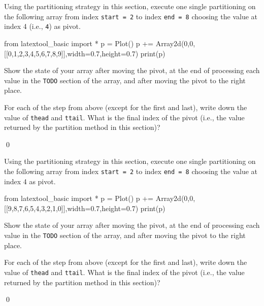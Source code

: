 \newpage
\begin{ex}
\begin{tightlist}
\item Using the partitioning strategy in this section,
execute one single partitioning on the following array
from index \verb!start = 2! to index \verb!end = 8!
choosing the value at index 4 (i.e., \verb!4!) as pivot.

\begin{python}
from latextool_basic import *
p = Plot()
p += Array2d(0,0,[[0,1,2,3,4,5,6,7,8,9]],width=0.7,height=0.7)
print(p)
\end{python}

Show the state of your array after moving the pivot, at the end of
processing each value in the \verb!TODO! section of the array,
and after moving the pivot to the right place.

\item For each of the step from above (except for the first and last),
write down the value of \verb!thead! and \verb!ttail!.
What is the final index of the pivot (i.e., the value returned
by the partition method in this section)? 

\end{tightlist}
\qed
\end{ex}


\newpage
\begin{ex}
\begin{tightlist}
\item Using the partitioning strategy in this section,
execute one single partitioning on the following array
from index \verb!start = 2! to index \verb!end = 8!
choosing the value at index 4 as pivot.

\begin{python}
from latextool_basic import *
p = Plot()
p += Array2d(0,0,[[9,8,7,6,5,4,3,2,1,0]],width=0.7,height=0.7)
print(p)
\end{python}

Show the state of your array after moving the pivot, at the end of
processing each value in the \verb!TODO! section of the array,
and after moving the pivot to the right place.

\item For each of the step from above (except for the first and last),
write down the value of \verb!thead! and \verb!ttail!.
What is the final index of the pivot (i.e., the value returned
by the partition method in this section)? 

\end{tightlist}
\qed
\end{ex}

